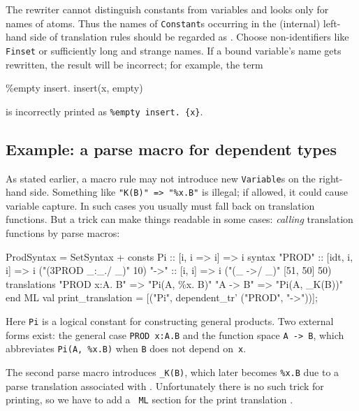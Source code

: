 \begin{warn}
  The \AST{} rewriter cannot distinguish constants from variables and looks
  only for names of atoms.  Thus the names of {\tt Constant}s occurring in
  the (internal) left-hand side of translation rules should be regarded as
  .  Choose non-identifiers like {\tt\at Finset} or
  sufficiently long and strange names.  If a bound variable's name gets
  rewritten, the result will be incorrect; for example, the term
\begin{ttbox}
\%empty insert. insert(x, empty)
\end{ttbox}
\par\noindent is incorrectly printed as \verb|%empty insert. {x}|.
\end{warn}


\subsection{Example: a parse macro for dependent types}\label{prod_trans}

As stated earlier, a macro rule may not introduce new {\tt Variable}s on
the right-hand side.  Something like \verb|"K(B)" => "%x.B"| is illegal;
if allowed, it could cause variable capture.  In such cases you usually
must fall back on translation functions.  But a trick can make things
readable in some cases: {\em calling\/} translation functions by parse
macros:
\begin{ttbox}
ProdSyntax = SetSyntax +
consts
  Pi            :: [i, i => i] => i
syntax
  "{\at}PROD"       :: [idt, i, i] => i       ("(3PROD _:_./ _)" 10)
  "{\at}->"         :: [i, i] => i            ("(_ ->/ _)" [51, 50] 50)
\ttbreak
translations
  "PROD x:A. B" => "Pi(A, \%x. B)"
  "A -> B"      => "Pi(A, _K(B))"
end
ML
  val print_translation = [("Pi", dependent_tr' ("{\at}PROD", "{\at}->"))];
\end{ttbox}

Here {\tt Pi} is a logical constant for constructing general products.
Two external forms exist: the general case {\tt PROD x:A.B} and the
function space {\tt A -> B}, which abbreviates \verb|Pi(A, %x.B)| when {\tt B}
does not depend on~{\tt x}.

The second parse macro introduces {\tt _K(B)}, which later becomes
\verb|%x.B| due to a parse translation associated with .
Unfortunately there is no such trick for printing, so we have to add a {\tt
ML} section for the print translation .

